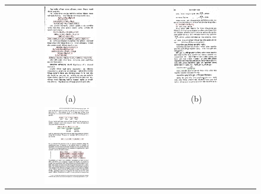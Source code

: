 \documentclass[oneside,a4paper,12pt]{book}
\begin{document}
\begin{figure}[!htb]\center\scriptsize
\begin{tabular}{|c|c|}
\hline
 \includegraphics[width=0.42\textwidth]{result1.png} &
 \includegraphics[width=0.42\textwidth]{result2.png} \\
 (a)  &(b)  \\
 \hline
  \includegraphics[width=0.42\textwidth]{result_3.png} &

\end{tabular}
\end{figure}
\end{document}
